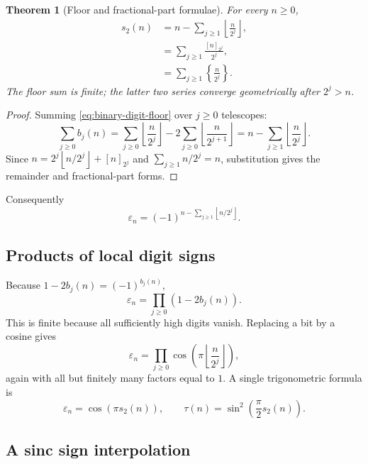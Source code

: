 \documentclass[11pt,oneside]{article}
\newtheorem{theorem}{Theorem}[section]
\theoremstyle{definition}
\theoremstyle{remark}
\newcommand{\bitsum}{s_2}
\newcommand{\eps}{\varepsilon}
\newcommand{\floor}[1]{\left\lfloor #1\right\rfloor}
\newcommand{\fracp}[1]{\left\{#1\right\}}
\begin{document}
\begin{theorem}[Floor and fractional-part formulae]\label{thm:floor-formulas}
For every $n\ge0$,
\begin{align}
 \bitsum(n)
 &=n-\sum_{j\ge1}\floor{\frac{n}{2^j}},\label{eq:legendre-floor}\\
 &=\sum_{j\ge1}\frac{[n]_{2^j}}{2^j},\label{eq:remainder-sum}\\
 &=\sum_{j\ge1}\fracp{\frac{n}{2^j}}.\label{eq:fractional-parts}
\end{align}
The floor sum is finite; the latter two series converge geometrically after
$2^j>n$.
\end{theorem}

\begin{proof}
Summing \cref{eq:binary-digit-floor} over $j\ge0$ telescopes:
\[
 \sum_{j\ge0}b_j(n)
 =\sum_{j\ge0}\floor{\frac n{2^j}}
  -2\sum_{j\ge0}\floor{\frac n{2^{j+1}}}
 =n-\sum_{j\ge1}\floor{\frac n{2^j}}.
\]
Since $n=2^j\floor{n/2^j}+[n]_{2^j}$ and
$\sum_{j\ge1}n/2^j=n$, substitution gives the remainder and
fractional-part forms.
\end{proof}

Consequently
\begin{equation}\label{eq:floor-sign}
  \eps_n=(-1)^{n-\sum_{j\ge1}\floor{n/2^j}}.
\end{equation}

\subsection{Products of local digit signs}

Because $1-2b_j(n)=(-1)^{b_j(n)}$,
\begin{equation}\label{eq:digit-product}
 \eps_n=\prod_{j\ge0}(1-2b_j(n)).
\end{equation}
This is finite because all sufficiently high digits vanish.  Replacing a bit by
a cosine gives
\begin{equation}\label{eq:cos-floor-product}
 \eps_n=\prod_{j\ge0}\cos\!\left(\pi\floor{\frac{n}{2^j}}\right),
\end{equation}
again with all but finitely many factors equal to $1$.  A single trigonometric
formula is
\begin{equation}\label{eq:single-cosine}
 \eps_n=\cos(\pi\bitsum(n)),
 \qquad
 \tau(n)=\sin^2\!\left(\frac{\pi}{2}\bitsum(n)\right).
\end{equation}

\subsection{A sinc sign interpolation}
\end{document}
